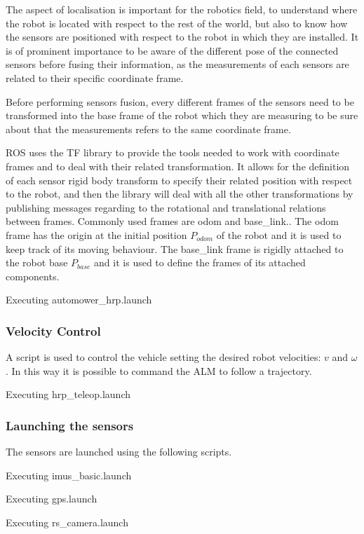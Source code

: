 The aspect of localisation is important for the robotics field, to understand where the robot is located with respect to the rest of the world, but also to know how the sensors are positioned with respect to the robot in which they are installed.
It is of prominent importance to be aware of the different pose of the connected sensors before fusing their information, as the measurements of each sensors are related to their specific coordinate frame.

Before performing sensors fusion, every different frames of the sensors need to be transformed into the base frame of the robot which they are measuring to be sure about that the measurements refers to the same coordinate frame.

\Gls{ROS} uses the TF\cite{6556373} library to provide the tools needed to work with coordinate frames and to deal with their related transformation.
It allows for the definition of each sensor rigid body transform to specify their related position with respect to the robot, and then the library will deal with all the other transformations by publishing messages regarding to the rotational and translational relations between frames.
Commonly used frames are odom and base\_link.. The odom frame has the origin at the initial position $P_{odom}$ of the robot and it is used to keep track of its moving behaviour. The base\_link frame is rigidly attached to the robot base $P_{base}$ and it is used to define the frames of its attached components.

Executing automower\_hrp.launch


\subsubsection{Velocity Control}
\label{sec:control}
\noindent A script is used to control the vehicle setting the desired robot velocities: $v$ and $\omega$.
In this way it is possible to command the \gls{ALM} to follow a trajectory.

Executing hrp\_teleop.launch


\subsubsection{Launching the sensors}
\noindent The sensors are launched using the following scripts.

Executing imus\_basic.launch

Executing gps.launch

Executing rs\_camera.launch

